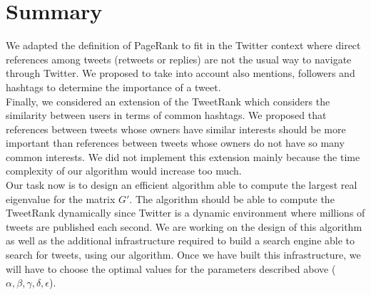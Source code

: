 \documentclass[12pt,a4paper]{article}
\begin{document}
\section{Summary}
We adapted the definition of PageRank to fit in the Twitter context where direct references among tweets (retweets or replies) are not the usual way to navigate through Twitter. We proposed to take into account also mentions, followers and hashtags to determine the importance of a tweet. \\

Finally, we considered an extension of the TweetRank which considers the similarity between users in terms of common hashtags. We proposed that references between tweets whose owners have similar interests should be more important than references between tweets whose owners do not have so many common interests. We did not implement this extension mainly because the time complexity of our algorithm would increase too much. \\

Our task now is to design an efficient algorithm able to compute the largest real eigenvalue for the matrix $G'$. The algorithm should be able to compute the TweetRank dynamically since Twitter is a dynamic environment where millions of tweets are published each second. We are working on the design of this algorithm as well as the additional infrastructure required to build a search engine able to search for tweets, using our algorithm. Once we have built this infrastructure, we will have to choose the optimal values for the parameters described above ($\alpha, \beta, \gamma, \delta, \epsilon$).
\end{document}

